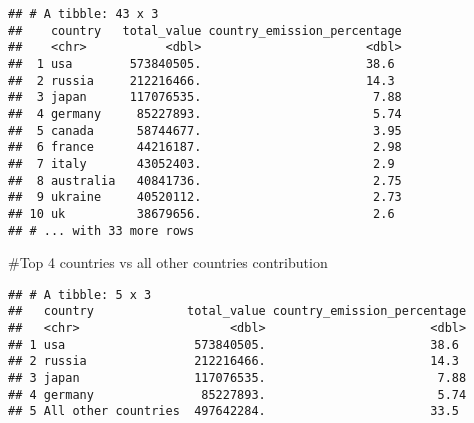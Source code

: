 \documentclass[
]{article}
\newenvironment{Shaded}{\begin{snugshade}}{\end{snugshade}}
\newcommand{\CommentTok}[1]{\textcolor[rgb]{0.56,0.35,0.01}{\textit{#1}}}
\newcommand{\DecValTok}[1]{\textcolor[rgb]{0.00,0.00,0.81}{#1}}
\newcommand{\KeywordTok}[1]{\textcolor[rgb]{0.13,0.29,0.53}{\textbf{#1}}}
\newcommand{\NormalTok}[1]{#1}
\newcommand{\OperatorTok}[1]{\textcolor[rgb]{0.81,0.36,0.00}{\textbf{#1}}}
\newcommand{\StringTok}[1]{\textcolor[rgb]{0.31,0.60,0.02}{#1}}
\begin{document}
\begin{verbatim}
## # A tibble: 43 x 3
##    country   total_value country_emission_percentage
##    <chr>           <dbl>                       <dbl>
##  1 usa        573840505.                       38.6 
##  2 russia     212216466.                       14.3 
##  3 japan      117076535.                        7.88
##  4 germany     85227893.                        5.74
##  5 canada      58744677.                        3.95
##  6 france      44216187.                        2.98
##  7 italy       43052403.                        2.9 
##  8 australia   40841736.                        2.75
##  9 ukraine     40520112.                        2.73
## 10 uk          38679656.                        2.6 
## # ... with 33 more rows
\end{verbatim}

\#Top 4 countries vs all other countries contribution

\begin{Shaded}
\end{Shaded}

\begin{verbatim}
## # A tibble: 5 x 3
##   country             total_value country_emission_percentage
##   <chr>                     <dbl>                       <dbl>
## 1 usa                  573840505.                       38.6 
## 2 russia               212216466.                       14.3 
## 3 japan                117076535.                        7.88
## 4 germany               85227893.                        5.74
## 5 All other countries  497642284.                       33.5
\end{verbatim}
\end{document}
